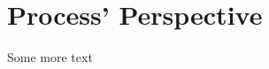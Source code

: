 \documentclass[main.tex]{subfiles}
\begin{document}
    \section{Process' Perspective}
    \label{Sec:process_perspective}
        Some more text
\end{document}

